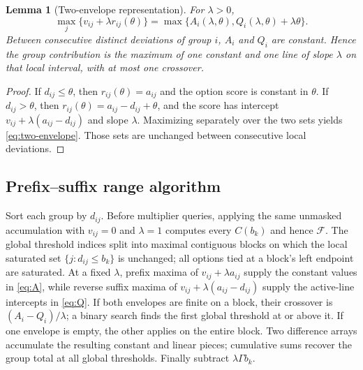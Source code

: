 \documentclass[11pt]{article}
\theoremstyle{plain}
\newtheorem{lemma}[theorem]{Lemma}
\theoremstyle{definition}
\theoremstyle{remark}
\begin{document}
\begin{lemma}[Two-envelope representation]\label{lem:two-envelope}
For $\lambda>0$,
\begin{equation}\label{eq:two-envelope}
\max_j\{v_{ij}+\lambda r_{ij}(\theta)\}
=\max\{A_i(\lambda,\theta),Q_i(\lambda,\theta)+\lambda\theta\}.
\end{equation}
Between consecutive distinct deviations of group $i$, $A_i$ and $Q_i$ are constant.  Hence the group contribution is the maximum of one constant and one line of slope $\lambda$ on that local interval, with at most one crossover.
\end{lemma}
\begin{proof}
If $d_{ij}\le\theta$, then $r_{ij}(\theta)=a_{ij}$ and the option score is constant in $\theta$.  If $d_{ij}>\theta$, then
$r_{ij}(\theta)=a_{ij}-d_{ij}+\theta$, and the score has intercept $v_{ij}+\lambda(a_{ij}-d_{ij})$ and slope $\lambda$.  Maximizing separately over the two sets yields \eqref{eq:two-envelope}.  Those sets are unchanged between consecutive local deviations.
\end{proof}

\subsection{Prefix--suffix range algorithm}

Sort each group by $d_{ij}$.  Before multiplier queries, applying the same unmasked accumulation with $v_{ij}=0$ and $\lambda=1$ computes every $C(b_k)$ and hence $\mathcal F$.  The global threshold indices split into maximal contiguous blocks on which the local saturated set $\{j:d_{ij}\le b_k\}$ is unchanged; all options tied at a block's left endpoint are saturated.  At a fixed $\lambda$, prefix maxima of $v_{ij}+\lambda a_{ij}$ supply the constant values in \eqref{eq:A}, while reverse suffix maxima of $v_{ij}+\lambda(a_{ij}-d_{ij})$ supply the active-line intercepts in \eqref{eq:Q}.  If both envelopes are finite on a block, their crossover is $(A_i-Q_i)/\lambda$; a binary search finds the first global threshold at or above it.  If one envelope is empty, the other applies on the entire block.  Two difference arrays accumulate the resulting constant and linear pieces; cumulative sums recover the group total at all global thresholds.  Finally subtract $\lambda\Gamma b_k$.
\end{document}
